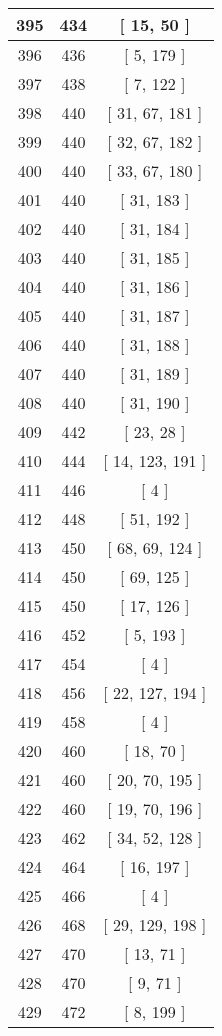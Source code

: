 \begin{center}
\begin{longtable}[H]{|| c c c ||}
\hline
395 & 434 & [ 15, 50 ] \\ 
\hline
396 & 436 & [ 5, 179 ] \\ 
\hline
397 & 438 & [ 7, 122 ] \\ 
\hline
398 & 440 & [ 31, 67, 181 ] \\ 
\hline
399 & 440 & [ 32, 67, 182 ] \\ 
\hline
400 & 440 & [ 33, 67, 180 ] \\ 
\hline
401 & 440 & [ 31, 183 ] \\ 
\hline
402 & 440 & [ 31, 184 ] \\ 
\hline
403 & 440 & [ 31, 185 ] \\ 
\hline
404 & 440 & [ 31, 186 ] \\ 
\hline
405 & 440 & [ 31, 187 ] \\ 
\hline
406 & 440 & [ 31, 188 ] \\ 
\hline
407 & 440 & [ 31, 189 ] \\ 
\hline
408 & 440 & [ 31, 190 ] \\ 
\hline
409 & 442 & [ 23, 28 ] \\ 
\hline
410 & 444 & [ 14, 123, 191 ] \\ 
\hline
411 & 446 & [ 4 ] \\ 
\hline
412 & 448 & [ 51, 192 ] \\ 
\hline
413 & 450 & [ 68, 69, 124 ] \\ 
\hline
414 & 450 & [ 69, 125 ] \\ 
\hline
415 & 450 & [ 17, 126 ] \\ 
\hline
416 & 452 & [ 5, 193 ] \\ 
\hline
417 & 454 & [ 4 ] \\ 
\hline
418 & 456 & [ 22, 127, 194 ] \\ 
\hline
419 & 458 & [ 4 ] \\ 
\hline
420 & 460 & [ 18, 70 ] \\ 
\hline
421 & 460 & [ 20, 70, 195 ] \\ 
\hline
422 & 460 & [ 19, 70, 196 ] \\ 
\hline
423 & 462 & [ 34, 52, 128 ] \\ 
\hline
424 & 464 & [ 16, 197 ] \\ 
\hline
425 & 466 & [ 4 ] \\ 
\hline
426 & 468 & [ 29, 129, 198 ] \\ 
\hline
427 & 470 & [ 13, 71 ] \\ 
\hline
428 & 470 & [ 9, 71 ] \\ 
\hline
429 & 472 & [ 8, 199 ] \\ 

\end{longtable}
\end{center}
